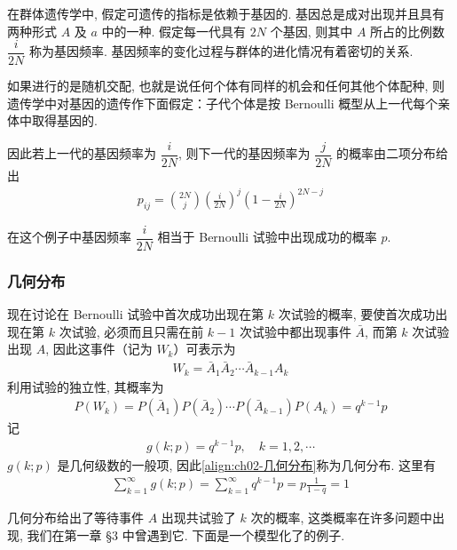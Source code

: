 \documentclass[../../main.tex]{subfiles}
\begin{document}
\begin{example}[群体遗传学中的基因频率]\label{example:ch02-群体遗传学基因频率}
在群体遗传学中, 假定可遗传的指标是依赖于基因的. 基因总是成对出现并且具有两种形式 $A$ 及 $a$ 中的一种. 假定每一代具有 $2N$ 个基因, 则其中 $A$ 所占的比例数 $\dfrac{i}{2N}$ 称为基因频率. 基因频率的变化过程与群体的进化情况有着密切的关系.

如果进行的是随机交配, 也就是说任何个体有同样的机会和任何其他个体配种, 则遗传学中对基因的遗传作下面假定：子代个体是按 Bernoulli 概型从上一代每个亲体中取得基因的.

因此若上一代的基因频率为 $\dfrac{i}{2N}$, 则下一代的基因频率为 $\dfrac{j}{2N}$ 的概率由二项分布给出
\begin{align*}
p_{ij}=\binom{2N}{j}\left(\frac{i}{2N}\right)^j\left(1-\frac{i}{2N}\right)^{2N-j}
\end{align*}

在这个例子中基因频率 $\dfrac{i}{2N}$ 相当于 Bernoulli 试验中出现成功的概率 $p$.
\end{example}

\subsubsection{几何分布}

现在讨论在 Bernoulli 试验中首次成功出现在第 $k$ 次试验的概率, 要使首次成功出现在第 $k$ 次试验, 必须而且只需在前 $k-1$ 次试验中都出现事件 $\bar{A}$, 而第 $k$ 次试验出现 $A$, 因此这事件（记为 $W_k$）可表示为
\begin{align}\label{align:ch02-几何分布事件}
W_k=\bar{A}_1\bar{A}_2\cdots\bar{A}_{k-1}A_k
\end{align}
利用试验的独立性, 其概率为
\begin{align*}
P(W_k)=P(\bar{A}_1)P(\bar{A}_2)\cdots P(\bar{A}_{k-1})P(A_k)=q^{k-1}p
\end{align*}
记
\begin{align}\label{align:ch02-几何分布}
g(k;p)=q^{k-1}p,\quad k=1,2,\cdots
\end{align}
$g(k;p)$ 是几何级数的一般项, 因此\eqref{align:ch02-几何分布}称为几何分布. 这里有
\begin{align}\label{align:ch02-几何分布归一化}
\sum_{k=1}^{\infty} g(k;p)=\sum_{k=1}^{\infty} q^{k-1}p=p\frac{1}{1-q}=1
\end{align}

几何分布给出了等待事件 $A$ 出现共试验了 $k$ 次的概率, 这类概率在许多问题中出现, 我们在第一章 \S3 中曾遇到它. 下面是一个模型化了的例子.
\end{document}
